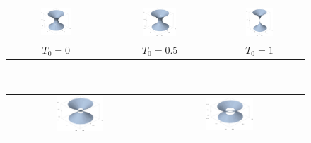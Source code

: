 \begin{figure}
\begin{center}
\begin{tabular}{ccc}
\includegraphics[width=0.33\textwidth]{max_flamm_paraboloid.png} &
\includegraphics[width=0.33\textwidth]{max_embedding_T0_05.png} &
\includegraphics[width=0.33\textwidth]{max_embedding_T0_10.png} \\
$T_0=0$ & $T_0=0.5$ & $T_0=1$
\end{tabular} \\
\begin{tabular}{cc}
\includegraphics[width=0.33\textwidth]{max_embedding_T0_15.png} &
\includegraphics[width=0.33\textwidth]{max_embedding_T0_20.png} \\

\end{tabular}
\end{center}
\end{figure}
